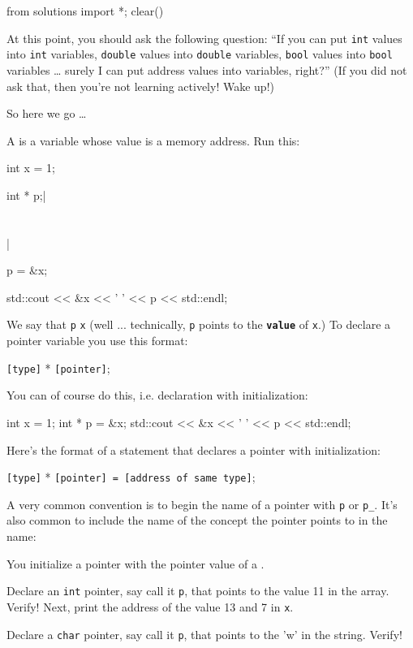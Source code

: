 \begin{python0}
from solutions import *; clear()
\end{python0}

At this point, you should ask the following question: ``If you can put \texttt{int} values into \texttt{int} variables, \texttt{double} values into \texttt{double} variables, \texttt{bool} values into \texttt{bool} variables \ldots{} surely I can put address values into variables, right?'' (If you did not ask that, then you're not learning actively! Wake up!)

So here we go \ldots{}

A  is a variable whose value is a memory
address. Run this:

\begin{consolethree}[escapeinside=||]
int x = 1;

int * p;|\\\\\\|

p = &x;         

std::cout << &x << ' ' << p << std::endl;
\end{consolethree}
\newpage
We say that \texttt{p}  \texttt{x} (well ... technically, \texttt{p} points to the \texttt{\textbf{value}} of \texttt{x}.) To declare a pointer variable you use this format:
\begin{center}
\texttt{[type]} * \texttt{[pointer]};
\end{center}
You can of course do this, i.e. declaration with initialization:

\begin{consolethree}[escapeinside=||]
int x = 1;
int * p = &x;
std::cout << &x << ' ' << p << std::endl;
\end{consolethree}
Here's the format of a statement that declares a pointer with
initialization:

\begin{center}
\texttt{[type]} * \texttt{[pointer] = [address of same type]};
\end{center}

A very common convention is to begin the name of a pointer with \texttt{p} or \texttt{p\_}. It's also common to include the name of the concept the pointer points to in the name:


You  initialize a pointer with the pointer value of a .


Declare an \texttt{int} pointer, say call it \texttt{p}, that points to the value 11 in the array. Verify! Next, print the address of the value 13 and 7 in \texttt{x}.

Declare a \texttt{char} pointer, say call it \texttt{p}, that points to the
'w' in the string. Verify!

